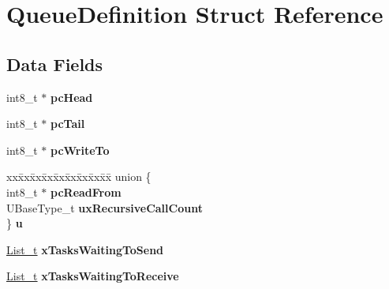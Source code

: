 \hypertarget{struct_queue_definition}{}\section{Queue\+Definition Struct Reference}
\label{struct_queue_definition}
\subsection*{Data Fields}
\begin{DoxyCompactItemize}
\item 
\hypertarget{struct_queue_definition_adfa75f7bc22a3a58a907676c0164a1c1}{}int8\+\_\+t $\ast$ {\bfseries pc\+Head}\label{struct_queue_definition_adfa75f7bc22a3a58a907676c0164a1c1}

\item 
\hypertarget{struct_queue_definition_aec0a6e253e1e05c107bf2a77c1bed940}{}int8\+\_\+t $\ast$ {\bfseries pc\+Tail}\label{struct_queue_definition_aec0a6e253e1e05c107bf2a77c1bed940}

\item 
\hypertarget{struct_queue_definition_aa018576801d60d3a78ffacab53dc8b79}{}int8\+\_\+t $\ast$ {\bfseries pc\+Write\+To}\label{struct_queue_definition_aa018576801d60d3a78ffacab53dc8b79}

\item 
\hypertarget{struct_queue_definition_ae98cf2c7800ab28ccfb454fafcbec572}{}\begin{tabbing}
xx\=xx\=xx\=xx\=xx\=xx\=xx\=xx\=xx\=\kill
union \{\\
\>int8\_t $\ast$ {\bfseries pcReadFrom}\\
\>UBaseType\_t {\bfseries uxRecursiveCallCount}\\
\} {\bfseries u}\label{struct_queue_definition_ae98cf2c7800ab28ccfb454fafcbec572}
\\

\end{tabbing}\item 
\hypertarget{struct_queue_definition_a5cfd8ae6db5da134ed16405043a0d898}{}\hyperlink{structx_l_i_s_t}{List\+\_\+t} {\bfseries x\+Tasks\+Waiting\+To\+Send}\label{struct_queue_definition_a5cfd8ae6db5da134ed16405043a0d898}

\item 
\hypertarget{struct_queue_definition_a8ad185d9d83713c774e6a897580d8313}{}\hyperlink{structx_l_i_s_t}{List\+\_\+t} {\bfseries x\+Tasks\+Waiting\+To\+Receive}\label{struct_queue_definition_a8ad185d9d83713c774e6a897580d8313}


\end{DoxyCompactItemize}
